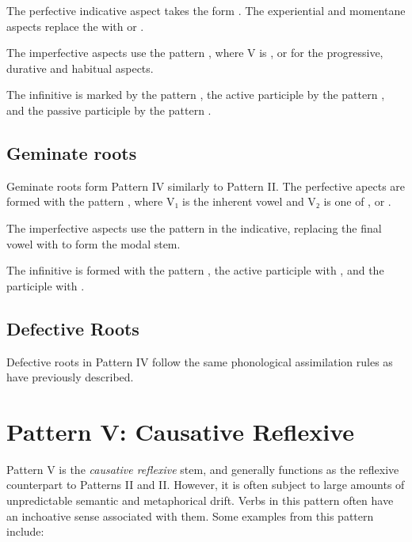 \documentclass[grammar]{subfiles}
\begin{document}
The perfective indicative aspect takes the form . The
experiential and momentane aspects replace the  with  or .

The imperfective aspects use the pattern , where V is
,  or  for the progressive, durative and habitual aspects.

The infinitive is marked by the pattern , the active participle
by the pattern , and the passive participle by the pattern
.


\subsection{Geminate roots}
\label{ssec:vm:iv_geminate_roots}

Geminate roots form Pattern IV similarly to Pattern II.   The perfective apects are formed with the pattern
, where V₁ is the inherent vowel and V₂ is one of ,
 or .

The imperfective aspects use the pattern  in the indicative,
replacing the final vowel with  to form the modal stem. 

The infinitive is formed with the pattern , the active participle
with , and the participle with .  


\subsection{Defective Roots}
\label{ssec:vm:iv_defective_roots}

Defective roots in Pattern IV follow the same phonological assimilation rules
as have previously described. 


\clearpage
\section{Pattern V: Causative Reflexive}
\label{sec:vm:pattern_v}

Pattern V is the \emph{causative reflexive} stem, and generally functions as
the reflexive counterpart to Patterns II and II.  However, it is often subject
to large amounts of unpredictable semantic and metaphorical drift.  Verbs in
this pattern often have an inchoative sense associated with them. Some examples
from this pattern include: 
\end{document}
